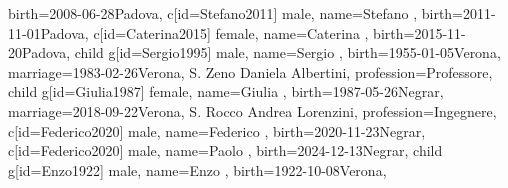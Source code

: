 \documentclass{article}
\begin{document}
\begin{midpage}
\begin{center}
\begin{genealogypicture}
{{{{{{{{{{                                        birth={2008-06-28}{Padova},
                                    }
                                    c[id=Stefano2011]{
                                        male,
                                        name={Stefano },
                                        birth={2011-11-01}{Padova},
                                    }
                                    c[id=Caterina2015]{
                                        female,
                                        name={Caterina },
                                        birth={2015-11-20}{Padova},
                                    }
                                }
                            }
                            child{
                                g[id=Sergio1995]{
                                    male,
                                    name={Sergio },
                                    birth={1955-01-05}{Verona},
                                    marriage={1983-02-26}{Verona, S. Zeno \newline Daniela Albertini},
                                    profession={Professore},
                                }
                                child{
                                    g[id=Giulia1987]{
                                        female,
                                        name={Giulia },
                                        birth={1987-05-26}{Negrar},
                                        marriage={2018-09-22}{Verona, S. Rocco \newline Andrea Lorenzini},
                                        profession={Ingegnere},
                                    }
                                    c[id=Federico2020]{
                                        male,
                                        name={Federico },
                                        birth={2020-11-23}{Negrar},
                                    }
                                    c[id=Federico2020]{
                                        male,
                                        name={Paolo },
                                        birth={2024-12-13}{Negrar},
                                    }
                                }
                            }
                        }
                        child{
                            g[id=Enzo1922]{
                                male,
                                name={Enzo },
                                birth={1922-10-08}{Verona},
}}}}}}}}
\end{genealogypicture}
\end{center}
\end{midpage}
\end{document}
